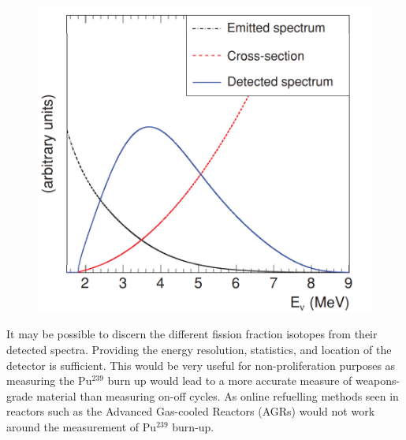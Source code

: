 \begin{figure}[!h]
 \centering
 \includegraphics[width=0.4\linewidth]{Chapter1/Figs/Raster/mullerEtAlDetectedSpectrum.png} %
 \label{mullerEtAlDetectedSpectrum}
\end{figure}

It may be possible to discern the different fission fraction isotopes from their detected spectra. Providing the energy resolution, statistics, and location of the detector is sufficient. This would be very useful for non-proliferation purposes as measuring the Pu$^{239}$ burn up would lead to a more accurate measure of weapons-grade material than measuring on-off cycles. As online refuelling methods seen in reactors such as the Advanced Gas-cooled Reactors (AGRs) would not work around the measurement of Pu$^{239}$ burn-up. 

\clearpage

